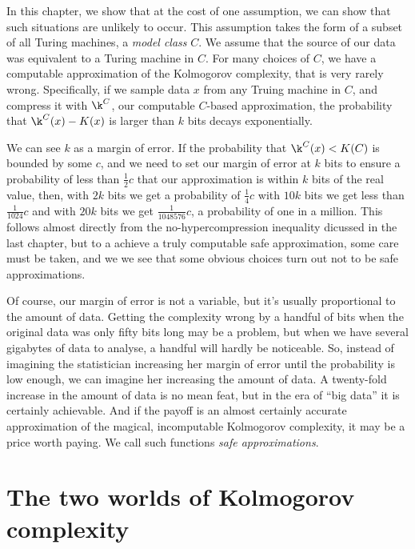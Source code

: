 In this chapter, we show that at the cost of one assumption, we can show that such situations are unlikely to occur. This assumption takes the form of a subset of all Turing machines, a \emph{model class} $C$. We assume that the source of our data was equivalent to a Turing machine in $C$. For many choices of $C$, we have a computable approximation of the Kolmogorov complexity, that is very rarely wrong. Specifically, if we sample data $x$ from any Truing machine in $C$, and compress it with $\k^C$, our computable $C$-based approximation, the probability that $\k^C(x) - K(x)$ is larger than $k$ bits decays exponentially. 


We can see $k$ as a margin of error. If the probability that $\k^C(x) < K(C)$ is bounded by some $c$, and we need to set our margin of error at $k$ bits to ensure a probability of less than $\frac{1}{2}c$ that our approximation is within $k$ bits of the real value, then, with $2k$ bits we get a probability of $\frac{1}{4}c$ with $10k$ bits we get less than $\frac{1}{1024}c$ and with $20k$ bits we get $\frac{1}{1048576}c$, a probability of one in a million. This follows almost directly from the no-hypercompression inequality dicussed in the last chapter, but to a achieve a truly computable safe approximation, some care must be taken, and we we see that some obvious choices turn out not to be safe approximations. 

Of course, our margin of error is not a variable, but it's usually proportional to the amount of data. Getting the complexity wrong by a handful of bits when the original data was only fifty bits long may be a problem, but when we have several gigabytes of data to analyse, a handful will hardly be noticeable. So, instead of imagining the statistician increasing her margin of error until the probability is low enough, we can imagine her increasing the amount of data. A twenty-fold increase in the amount of data is no mean feat, but in the era of ``big data'' it is certainly achievable. And if the payoff is an almost certainly accurate approximation of the magical, incomputable Kolmogorov complexity, it may be a price worth paying. We call such functions \emph{safe approximations}. 


\section{The two worlds of Kolmogorov complexity} 

